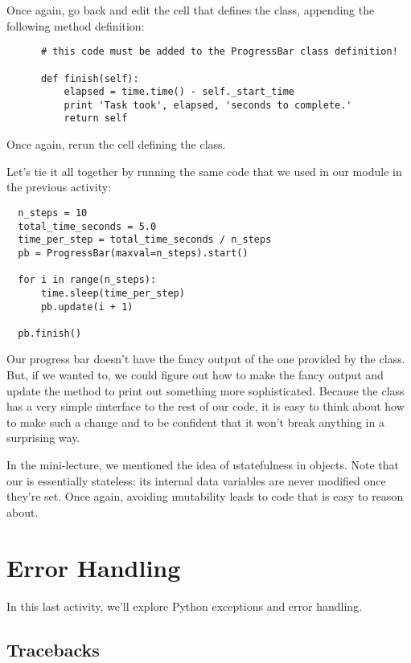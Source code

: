 \documentclass[letterpaper, 12pt, titlepage, twoside]{article}
\begin{document}
Once again, go back and edit the cell that defines the  class,
appending the following method definition:

\begin{lstlisting}
      # this code must be added to the ProgressBar class definition!

      def finish(self):
          elapsed = time.time() - self._start_time
          print 'Task took', elapsed, 'seconds to complete.'
          return self
\end{lstlisting}

Once again, rerun the cell defining the class.

Let's tie it all together by running the same code that we used in our module
in the previous activity:

\begin{lstlisting}
  n_steps = 10
  total_time_seconds = 5.0
  time_per_step = total_time_seconds / n_steps
  pb = ProgressBar(maxval=n_steps).start()

  for i in range(n_steps):
      time.sleep(time_per_step)
      pb.update(i + 1)

  pb.finish()
\end{lstlisting}

Our progress bar doesn't have the fancy output of the one provided by the
 class. But, if we wanted to, we could figure out how to make
the fancy output and update the  method to print out something
more sophisticated. Because the  class has a very simple
\i{interface} to the rest of our code, it is easy to think about how to make
such a change and to be confident that it won't break anything in a surprising
way.

In the mini-lecture, we mentioned the idea of \i{statefulness} in objects.
Note that our  is essentially stateless: its internal data
variables are never modified once they're set. Once again, avoiding
\i{mutability} leads to code that is easy to reason about.


\newpage
\section{Error Handling}

In this last activity, we'll explore Python exceptions and error handling.

\subsection*{Tracebacks}
\end{document}
